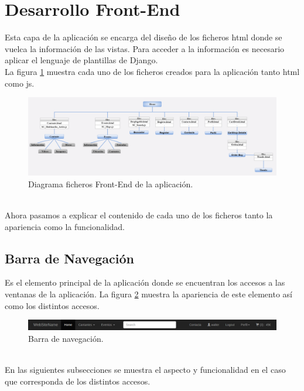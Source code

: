 \section{Desarrollo Front-End}
Esta capa de la aplicación se encarga del diseño de los ficheros html donde se vuelca la información de las vistas. Para acceder a la información es necesario aplicar el lenguaje de plantillas de Django.
\\La figura \ref{fig:diagrama_Front_End} muestra cada uno de los ficheros creados para la aplicación tanto html como js.
\begin{figure}[!h]
\begin{center}
   \includegraphics[width=0.8\linewidth]{Figures/diagrama_Front_End}
  \decoRule
  \caption[Diagrama ficheros Front-End de la aplicación.]{Diagrama ficheros Front-End de la aplicación.}
\label{fig:diagrama_Front_End}
\end{center}
\end{figure}
\\Ahora pasamos a explicar el contenido de cada uno de los ficheros tanto la apariencia como la funcionalidad.
\subsection*{Barra de Navegación}
Es el elemento principal de la aplicación donde se encuentran los accesos a las ventanas de la aplicación. La figura \ref{fig:Nav_Bar} muestra la apariencia de este elemento así como los distintos accesos.
\begin{figure}[!h]
\begin{center}
   \includegraphics[width=0.7\linewidth]{Figures/Nav}
  \decoRule
  \caption[Barra de navegación]{Barra de navegación.}
\label{fig:Nav_Bar}
\end{center}
\end{figure}
\\En las siguientes subsecciones se muestra el aspecto y funcionalidad en el caso que corresponda de los distintos accesos.
